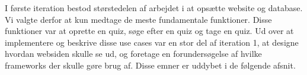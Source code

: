 I første iteration bestod størstedelen af arbejdet i at opsætte website og database. Vi valgte derfor at kun medtage de meste fundamentale funktioner. Disse funktioner var at oprette en quiz, søge efter en quiz og tage en quiz. Ud over at implementere og beskrive disse use cases var en stor del af iteration 1, at designe hvordan websiden skulle se ud, og foretage en forundersøgelse af hvilke frameworks der skulle gøre brug af. Disse emner er uddybet i de følgende afsnit.















